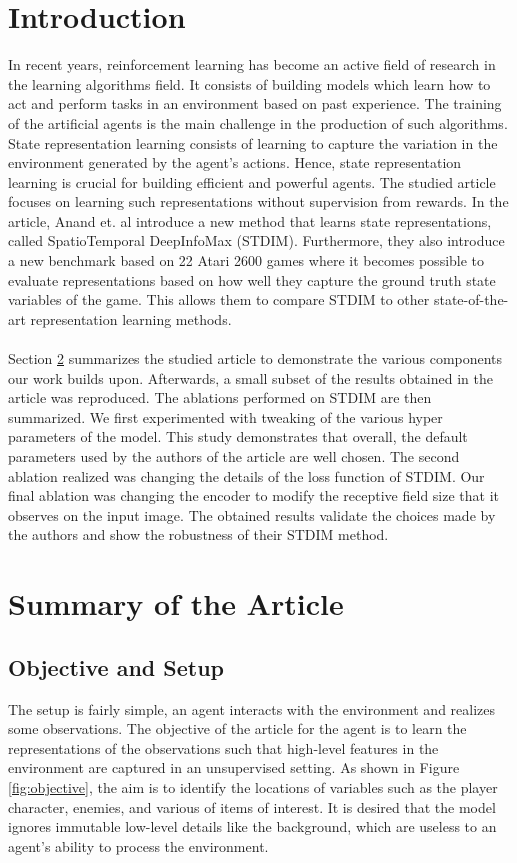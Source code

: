 \documentclass{article}
\begin{document}
\section{Introduction}
In recent years, reinforcement learning has become an active field of research in the learning algorithms field. It consists of building models which learn how to act and perform tasks in an environment based on past experience. The training of the artificial agents is the main challenge in the production of such algorithms. State representation learning consists of learning to capture the variation in the environment generated by the agent's actions. Hence, state representation learning is crucial for building efficient and powerful agents. The studied article focuses on learning such representations without supervision from rewards. In the article, Anand et. al introduce a new method that learns state representations, called SpatioTemporal DeepInfoMax (STDIM). Furthermore, they also introduce a new benchmark based on 22 Atari 2600 games where it becomes possible to evaluate representations based on how well they capture the ground truth state variables of the game. This allows them to compare STDIM to other state-of-the-art representation learning methods.
\\\\
Section \ref{section:summary} summarizes the studied article to demonstrate the various components our work builds upon. Afterwards, a small subset of the results obtained in the article was reproduced. The ablations performed on STDIM are then summarized. We first experimented with tweaking of the various hyper parameters of the model. This study demonstrates that overall, the default parameters used by the authors of the article are well chosen. The second ablation realized was changing the details of the loss function of STDIM. Our final ablation was changing the encoder to modify the receptive field size that it observes on the input image. The obtained results validate the choices made by the authors and show the robustness of their STDIM method.

\section{Summary of the Article}
\label{section:summary}

\subsection{Objective and Setup}
The setup is fairly simple, an agent interacts with the environment and realizes some observations. The objective of the article for the agent is to learn the representations of the observations such that high-level features in the environment are captured in an unsupervised setting. As shown in Figure \ref{fig:objective}, the aim is to identify the locations of variables such as the player character, enemies, and various of items of interest. It is desired that the model ignores immutable low-level details like the background, which are useless to an agent's ability to process the environment.
\end{document}
